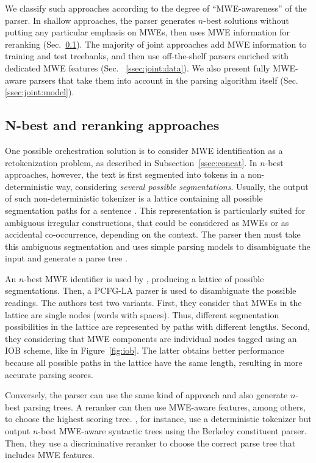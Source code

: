 \documentclass[output=paper]{LSP/langsci}
\begin{document}
We classify such approaches according to the degree of  ``MWE-awareness'' of the parser.
In shallow approaches, the parser generates $n$-best solutions without putting any particular emphasis on MWEs, then uses MWE information for reranking (Sec.~\ref{ssec:joint:rerank}).
The majority of joint approaches add MWE information to training and test treebanks, and then use off-the-shelf parsers enriched with dedicated MWE features (Sec.~ \ref{ssec:joint:data}). 
We also present fully MWE-aware parsers that take them into account in the parsing algorithm itself (Sec.~ \ref{ssec:joint:model}).


\subsection{N-best and reranking approaches }
\label{ssec:joint:rerank}

One possible orchestration solution is to consider MWE identification as a retokenization problem, as described in Subsection~\ref{ssec:concat}.
In $n$-best approaches, however, the text is first segmented into tokens in a non-deterministic way, considering \emph{several possible segmentations}.
Usually, the output of such non-deterministic tokenizer is a lattice containing all possible segmentation paths for a sentence \citep{sagot:2005}.
This representation is particularly suited for ambiguous irregular constructions, that could be considered as MWEs or as accidental co-occurrence, depending on the context.
The parser then must take this ambiguous segmentation and uses simple parsing models to disambiguate the input and generate a parse tree \citep{nasr:11}.

An $n$-best MWE identifier is used by \citet{constant13}, producing a lattice of possible segmentations. Then, a PCFG-LA parser is used to disambiguate the possible readings. The authors test two variants. First, they consider that MWEs in the lattice are single nodes (words with spaces). 
Thus, different segmentation possibilities in the lattice are represented by paths with different lengths. Second, they considering that MWE components are individual nodes tagged using an IOB scheme, like in Figure~\ref{fig:iob}. The latter obtains better performance because all possible paths in the lattice have the same length, resulting in more accurate parsing scores.

Conversely, the parser can use the same kind of approach and also generate $n$-best parsing trees.
A reranker can then use MWE-aware features, among others, to choose the highest scoring tree. \citet{constant12}, for instance, use a deterministic tokenizer but output $n$-best MWE-aware syntactic trees using the Berkeley constituent parser. Then, they use a discriminative reranker to choose the correct parse tree that includes MWE features.  
\end{document}
